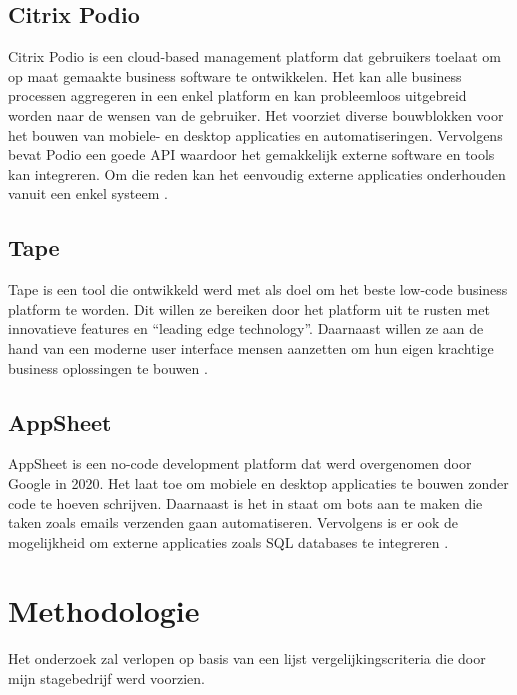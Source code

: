 \subsection{Citrix Podio}

Citrix Podio is een cloud-based management platform dat gebruikers toelaat om op maat gemaakte business software te ontwikkelen. Het kan alle business processen aggregeren in een enkel platform en kan probleemloos uitgebreid worden naar de wensen van de gebruiker. Het voorziet diverse bouwblokken voor het bouwen van mobiele- en desktop applicaties en automatiseringen. Vervolgens bevat Podio een goede API waardoor het gemakkelijk externe software en tools kan integreren. Om die reden kan het eenvoudig externe applicaties onderhouden vanuit een enkel systeem \autocite{Quivvy}.  


\subsection{Tape}

Tape is een tool die ontwikkeld werd met als doel om het beste low-code business platform te worden. Dit willen ze bereiken door het platform uit te rusten met innovatieve features en “leading edge technology”. Daarnaast willen ze aan de hand van een moderne user interface mensen aanzetten om hun eigen krachtige business oplossingen te bouwen \autocite{Tape2019}.

\subsection{AppSheet}

AppSheet is een no-code development platform dat werd overgenomen door Google in 2020. Het laat toe om mobiele en desktop applicaties te bouwen zonder code te hoeven schrijven. Daarnaast is het in staat om bots aan te maken die taken zoals emails verzenden gaan automatiseren. Vervolgens is er ook de mogelijkheid om externe applicaties zoals SQL databases te integreren \autocite{AppSheet2020}. 


\section{Methodologie}%
\label{sec:methodologie}

Het onderzoek zal verlopen op basis van een lijst vergelijkingscriteria die door mijn stagebedrijf werd voorzien. 

